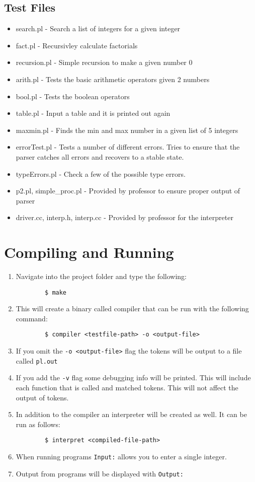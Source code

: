 \documentclass{article}
\begin{document}
\subsection{Test Files}
\begin{itemize}
  \item search.pl - Search a list of integers for a given integer
  \item fact.pl - Recursivley calculate factorials
  \item recursion.pl - Simple recursion to make a given number 0
  \item arith.pl - Tests the basic arithmetic operators given 2 numbers
  \item bool.pl - Tests the boolean operators
  \item table.pl - Input a table and it is printed out again
  \item maxmin.pl - Finds the min and max number in a given list of 5 integers

  \item errorTest.pl - Tests a number of different errors. Tries to ensure that the parser catches all errors and recovers to a stable state.
  \item typeErrors.pl - Check a few of the possible type errors.

  \item p2.pl, simple\_proc.pl - Provided by professor to ensure proper output of parser
  \item driver.cc, interp.h, interp.cc - Provided by professor for the interpreter
\end{itemize}

\section{Compiling and Running}
\begin{enumerate}
	\item Navigate into the project folder and type the following:

\verb|        $ make|

	\item This will create a binary called compiler that can be run with the following command:

\verb|        $ compiler <testfile-path> -o <output-file>|

	\item If you omit the \verb|-o <output-file>| flag the tokens will be output to a file called \verb|pl.out|
	\item If you add the \verb|-v| flag some debugging info will be printed. This will include each function that is called and matched tokens. This will not affect the output of tokens.
    \item In addition to the compiler an interpreter will be created as well. It can be run as follows:

\verb|        $ interpret <compiled-file-path>|
    \item When running programs \verb|Input:| allows you to enter a single integer.
    \item Output from programs will be displayed with \verb|Output:|
\end{enumerate}
\end{document}
